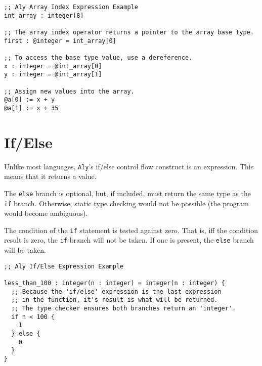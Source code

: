 \documentclass[12pt]{report}
\begin{document}
\begin{Verbatim}[samepage=true]
;; Aly Array Index Expression Example
int_array : integer[8]

;; The array index operator returns a pointer to the array base type.
first : @integer = int_array[0]

;; To access the base type value, use a dereference.
x : integer = @int_array[0]
y : integer = @int_array[1]

;; Assign new values into the array.
@a[0] := x + y
@a[1] := x + 35
\end{Verbatim}

\section{If/Else}
\label{subsec:expressions-if-else}

Unlike most languages, \verb|Aly|'s if/else control flow construct is an expression. This means that it returns a value.

The \verb|else| branch is optional, but, if included, must return the same type as the \verb|if| branch. Otherwise, static type checking would not be possible (the program would become ambiguous).

The condition of the \verb|if| statement is tested against zero. That is, iff the condition result is zero, the \verb|if| branch will not be taken. If one is present, the \verb|else| branch will be taken.

\begin{Verbatim}[samepage=true]
;; Aly If/Else Expression Example

less_than_100 : integer(n : integer) = integer(n : integer) {
  ;; Because the 'if/else' expression is the last expression
  ;; in the function, it's result is what will be returned.
  ;; The type checker ensures both branches return an 'integer'.
  if n < 100 {
    1
  } else {
    0
  }
}
\end{Verbatim}
\end{document}
